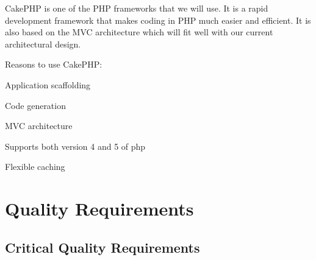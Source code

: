 \documentclass[a4paper,12pt]{report}
\begin{document}
\begin{description}
\item CakePHP is one of the PHP frameworks that we will use. It is a rapid development framework that makes coding in PHP much easier and efficient. It is also based on the MVC architecture which will fit well with our current architectural design. 
\item Reasons to use CakePHP:
\item[$\bullet$]Application scaffolding
\item[$\bullet$]Code generation
\item[$\bullet$] MVC architecture
\item[$\bullet$]Supports both version 4 and 5 of php
\item[$\bullet$]Flexible caching

\end{description}

\section{Quality Requirements}
	\subsection{Critical Quality Requirements}
\end{document}
